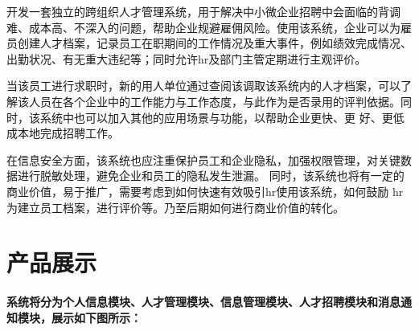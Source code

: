 \documentclass[UTF8]{ctexart}
\begin{document}
开发一套独立的跨组织人才管理系统，用于解决中小微企业招聘中会面临的背调难、成本高、不深入的问题，帮助企业规避雇佣风险。使用该系统，企业可以为雇员创建人才档案，记录员工在职期间的工作情况及重大事件，例如绩效完成情况、出勤状况、有无重大违纪等；同时允许hr及部门主管定期进行主观评价。 

当该员工进行求职时，新的用人单位通过查阅该调取该系统内的人才档案，可以了解该人员在各个企业中的工作能力与工作态度，与此作为是否录用的评判依据。同时，该系统中也可以加入其他的应用场景与功能，以帮助企业更快、更 好、更低成本地完成招聘工作。

在信息安全方面，该系统也应注重保护员工和企业隐私，加强权限管理，对关键数据进行脱敏处理，避免企业和员工的隐私发生泄漏。 同时，该系统也将有一定的商业价值，易于推广，需要考虑到如何快速有效吸引hr使用该系统，如何鼓励 hr 为建立员工档案，进行评价等。乃至后期如何进行商业价值的转化。
\newpage\section{产品展示}
\paragraph{系统将分为个人信息模块、人才管理模块、信息管理模块、人才招聘模块和消息通知模块，展示如下图所示：}
\end{document}
